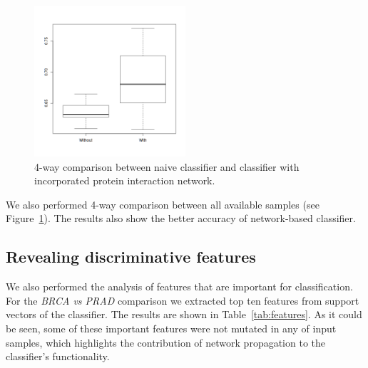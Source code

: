 \documentclass[a4paper]{article}
\begin{document}
\begin{figure} [h]
\centering
	\includegraphics[width=0.5\textwidth]{figures/4-way.png}
\caption{4-way comparison between naive classifier and classifier with incorporated
		 protein interaction network.}
\label{fig:4-way}
\end{figure}

We also performed 4-way comparison between all available samples 
(see Figure~\ref{fig:4-way}). The results also show the better accuracy
of network-based classifier.

\subsection{Revealing discriminative features}

We also performed the analysis of features that are important for classification.
For the \emph{BRCA vs PRAD} comparison we extracted top ten features 
from support vectors of the classifier. The results are shown in Table~\ref{tab:features}.
As it could be seen, some of these important features were not mutated in any of
input samples, which highlights the contribution of network propagation to the
classifier's functionality.
\end{document}
